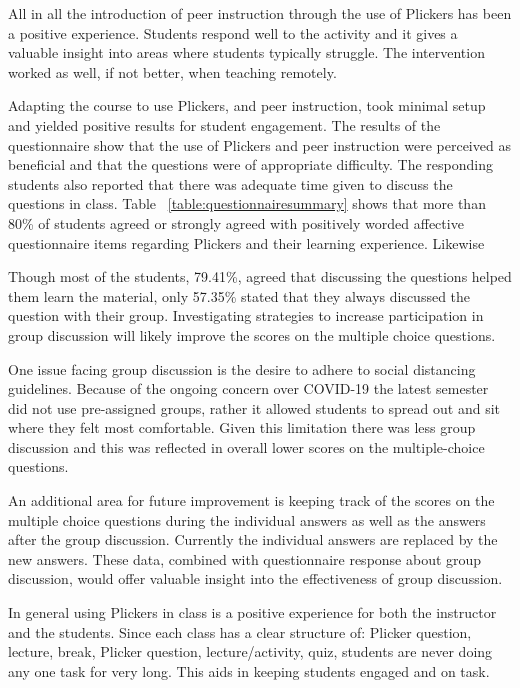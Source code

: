 \documentclass[12pt]{article}
\begin{document}
All in all the introduction of peer instruction through the use of Plickers has been a positive experience. Students respond well to the activity and it gives a valuable insight into areas where students typically struggle. The intervention worked as well, if not better, when teaching remotely. 

Adapting the course to use Plickers, and peer instruction, took minimal setup and yielded positive results for student engagement. The results of the questionnaire show that the use of Plickers and peer instruction were perceived as beneficial and that the questions were of appropriate difficulty. The responding students also reported that there was adequate time given to discuss the questions in class. Table ~\ref{table:questionnairesummary} shows that more than 80\% of students agreed or strongly agreed with positively worded affective questionnaire items regarding Plickers and their learning experience. Likewise 

Though most of the students, 79.41\%, agreed that discussing the questions helped them learn the material, only 57.35\% stated that they always discussed the question with their group. Investigating strategies to increase participation in group discussion will likely improve the scores on the multiple choice questions.

One issue facing group discussion is the desire to adhere to social distancing guidelines. Because of the ongoing concern over COVID-19 the latest semester did not use pre-assigned groups, rather it allowed students to spread out and sit where they felt most comfortable. Given this limitation there was less group discussion and this was reflected in overall lower scores on the multiple-choice questions. 

An additional area for future improvement is keeping track of the scores on the multiple choice questions during the individual answers as well as the answers after the group discussion. Currently the individual answers are replaced by the new answers. These data, combined with questionnaire response about group discussion, would offer valuable insight into the effectiveness of group discussion.

In general using Plickers in class is a positive experience for both the instructor and the students. Since each class has a clear structure of: Plicker question, lecture, break, Plicker question, lecture/activity, quiz, students are never doing any one task for very long. This aids in keeping students engaged and on task.
\end{document}

